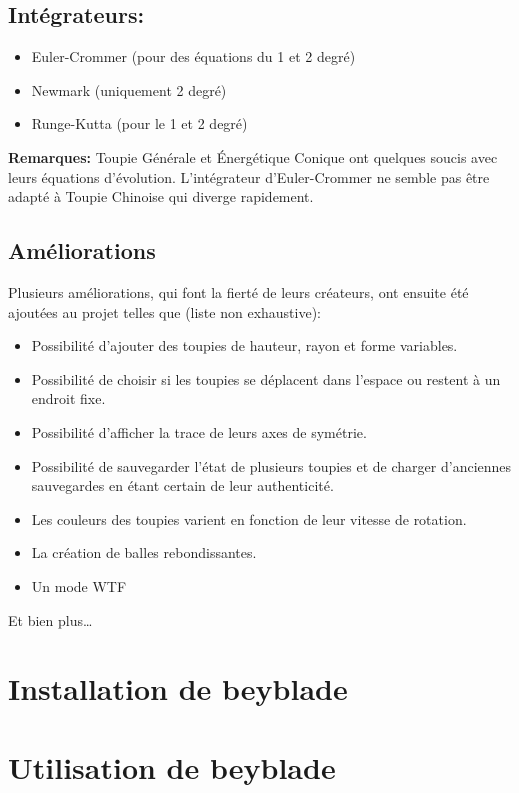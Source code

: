 \documentclass[a4paper]{article}%
\begin{document}
	\subsection {Intégrateurs:}
		\begin {itemize} 
			\item Euler-Crommer (pour des équations du 1\ier{} et 2\ieme{} degré)
			\item Newmark (uniquement 2\ieme{} degré)
			\item Runge-Kutta (pour le 1\ier{} et 2\ieme{} degré)
		\end {itemize} 
	\textbf {Remarques: }Toupie Générale et Énergétique Conique ont quelques soucis avec leurs équations d'évolution. L'intégrateur d'Euler-Crommer ne semble pas être adapté à Toupie Chinoise qui diverge rapidement. 
		
	\subsection {Améliorations}
		Plusieurs améliorations, qui font la fierté de leurs créateurs, ont ensuite été ajoutées au projet telles que (liste non exhaustive):
	
		\begin {itemize}
			\item Possibilité d'ajouter des toupies de hauteur, rayon et forme variables.
			\item Possibilité de choisir si les toupies se déplacent dans l'espace ou restent à un endroit fixe. 
			\item Possibilité d'afficher la trace de leurs axes de symétrie. 
			\item Possibilité de sauvegarder l'état de plusieurs toupies et de charger d'anciennes sauvegardes en étant certain de leur authenticité.
			\item Les couleurs des toupies varient en fonction de leur vitesse de rotation.
			\item La création de balles rebondissantes.
			\item Un mode WTF 
		\end {itemize}
		Et bien plus…

\section{Installation de beyblade}

\section{Utilisation de beyblade}
\end{document}
